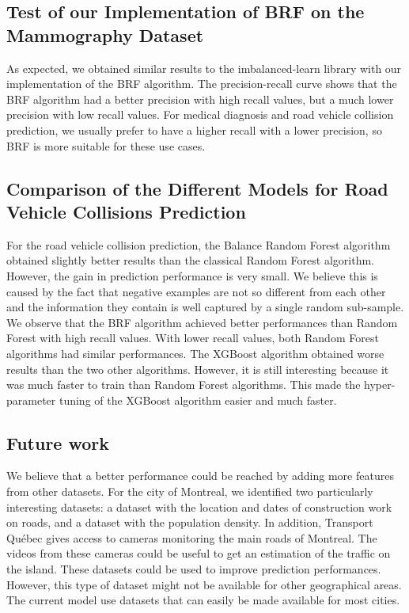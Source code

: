 \documentclass[conference]{IEEEtran}
\begin{document}
\subsection{Test of our Implementation of BRF on the Mammography Dataset}
As expected, we obtained similar results to the imbalanced-learn library with our implementation of the BRF algorithm. The precision-recall curve shows that the BRF algorithm had a better precision with high recall values, but a much lower precision with low recall values. For medical diagnosis and road vehicle collision prediction, we usually prefer to have a higher recall with a lower precision, so BRF is more suitable for these use cases.

\subsection{Comparison of the Different Models for Road Vehicle Collisions Prediction}
For the road vehicle collision prediction, the Balance Random Forest algorithm obtained slightly better results than the classical Random Forest algorithm. However, the gain in prediction performance is very small. 
We believe this is caused by the fact that negative examples are not so different from each other and the information they contain is well captured by a single random sub-sample. We observe that the BRF algorithm achieved better performances than Random Forest with high recall values. With lower recall values, both Random Forest algorithms had similar performances. The XGBoost algorithm obtained worse results than the two other algorithms. However, it is still interesting because it was much faster to train than Random Forest algorithms. This made the hyper-parameter tuning of the XGBoost algorithm easier and much faster.


\subsection{Future work}

We believe that a better performance could be reached by adding more features
from other datasets. For the city of Montreal, we identified two
particularly interesting datasets: a dataset with the location and dates of
construction work on roads, and a dataset with the population density.
In addition, Transport Qu\'ebec gives access to cameras monitoring the main
roads of Montreal. The videos from these cameras could be useful to get an
estimation of the traffic on the island. 
These datasets could be used to improve prediction performances.
However, this type of dataset might not be available for other geographical areas.
The current model use datasets that can easily be made available for most cities.
\end{document}
